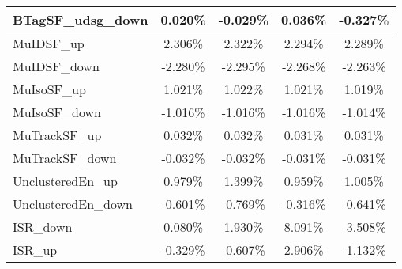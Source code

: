 \begin{table}[]
{\begin{tabular}{|l|c|c|c|c|}
BTagSF\_udsg\_down                          & 0.020\%                           & -0.029\%                           & 0.036\%                          & -0.327\%                           \\ \hline     
MuIDSF\_up                             & 2.306\%                              & 2.322\%                              & 2.294\%                             & 2.289\%                              \\ \hline    
MuIDSF\_down                           & -2.280\%                            & -2.295\%                            & -2.268\%                           & -2.263\%                            \\ \hline    
MuIsoSF\_up                            & 1.021\%                             & 1.022\%                             & 1.021\%                            & 1.019\%                             \\ \hline           
MuIsoSF\_down                          & -1.016\%                           & -1.016\%                           & -1.016\%                          & -1.014\%                           \\ \hline    
MuTrackSF\_up                          & 0.032\%                           & 0.032\%                           & 0.031\%                          & 0.031\%                           \\ \hline    
MuTrackSF\_down                        & -0.032\%                         & -0.032\%                         & -0.031\%                        & -0.031\%                         \\ \hline  
UnclusteredEn\_up                         & 0.979\%                          & 1.399\%                          & 0.959\%                         & 1.005\%                          \\ \hline    
UnclusteredEn\_down                      & -0.601\%                         & -0.769\%                        & -0.316\%                       & -0.641\%                        \\ \hline   \hline 
ISR\_down                                & 0.080\%                                   & 1.930\%                                  & 8.091\%                                 & -3.508\%                                  \\ \hline
ISR\_up                                  & -0.329\%                                     & -0.607\%                                    & 2.906\%                                   & -1.132\%                                    \\ \hline

\end{tabular}}
\end{table}
